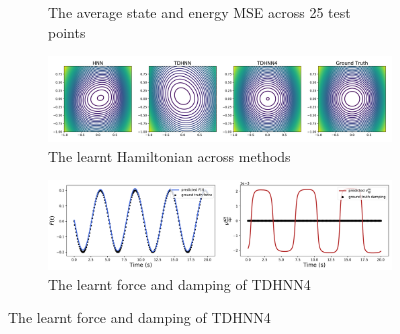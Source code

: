 \documentclass{article}
\begin{document}
\begin{figure}[!htb]
\begin{subfigure}[b]{0.48\textwidth}
\caption{The average state and energy MSE across 25 test points}
\end{subfigure}
\begin{subfigure}[b]{0.48\textwidth}
\includegraphics[width=\textwidth]{figures/figures/relativity/1/relativity_ham.pdf}
\caption{The learnt Hamiltonian across methods}
\end{subfigure}
\begin{subfigure}[b]{0.48\textwidth}
\includegraphics[width=\textwidth]{figures/figures/relativity/1/relativity_dpdt_new_0.pdf}
\caption{The learnt force and damping of TDHNN4}
\end{subfigure}
\label{duffing_1_full}
\end{figure}

\pagebreak
\onecolumn
\end{document}
